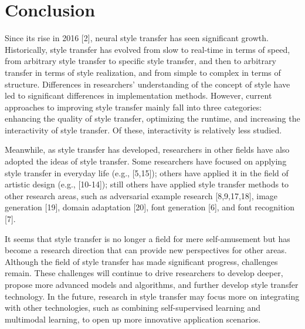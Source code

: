 \section{Conclusion}

Since its rise in 2016 [2], neural style transfer has seen significant growth. Historically, style transfer has evolved from slow to real-time in terms of speed, from arbitrary style transfer to specific style transfer, and then to arbitrary transfer in terms of style realization, and from simple to complex in terms of structure. Differences in researchers' understanding of the concept of style have led to significant differences in implementation methods. However, current approaches to improving style transfer mainly fall into three categories: enhancing the quality of style transfer, optimizing the runtime, and increasing the interactivity of style transfer. Of these, interactivity is relatively less studied.

Meanwhile, as style transfer has developed, researchers in other fields have also adopted the ideas of style transfer. Some researchers have focused on applying style transfer in everyday life (e.g., [5,15]); others have applied it in the field of artistic design (e.g., [10-14]); still others have applied style transfer methods to other research areas, such as adversarial example research [8,9,17,18], image generation [19], domain adaptation [20], font generation [6], and font recognition [7].

It seems that style transfer is no longer a field for mere self-amusement but has become a research direction that can provide new perspectives for other areas. Although the field of style transfer has made significant progress, challenges remain. These challenges will continue to drive researchers to develop deeper, propose more advanced models and algorithms, and further develop style transfer technology. In the future, research in style transfer may focus more on integrating with other technologies, such as combining self-supervised learning and multimodal learning, to open up more innovative application scenarios.
